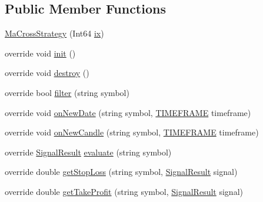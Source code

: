 \subsection*{Public Member Functions}
\begin{DoxyCompactItemize}
\item 
\hyperlink{class_m_q_l4_c_sharp_1_1_user_defined_1_1_strategy_1_1_ma_cross_strategy_ae179f0140b4940b6f551dae60779428c}{Ma\+Cross\+Strategy} (Int64 \hyperlink{class_m_q_l4_c_sharp_1_1_base_1_1_m_q_l_1_1_m_q_l_expert_a98b5a835bb18c023f5160275efa74619}{ix})
\item 
override void \hyperlink{class_m_q_l4_c_sharp_1_1_user_defined_1_1_strategy_1_1_ma_cross_strategy_a76a9c2deb711a2a3a138e7c4018ac866}{init} ()
\item 
override void \hyperlink{class_m_q_l4_c_sharp_1_1_user_defined_1_1_strategy_1_1_ma_cross_strategy_aaffd8074c2a2ac779dba660fa93ac98a}{destroy} ()
\item 
override bool \hyperlink{class_m_q_l4_c_sharp_1_1_user_defined_1_1_strategy_1_1_ma_cross_strategy_a58acaed3f2af61e2e0a44b1000b16dac}{filter} (string symbol)
\item 
override void \hyperlink{class_m_q_l4_c_sharp_1_1_user_defined_1_1_strategy_1_1_ma_cross_strategy_ac368867b2efe1f689dfbd8af2203a203}{on\+New\+Date} (string symbol, \hyperlink{namespace_m_q_l4_c_sharp_1_1_base_1_1_enums_a838810aaa87c63c12737408dba8c0b35}{T\+I\+M\+E\+F\+R\+A\+ME} timeframe)
\item 
override void \hyperlink{class_m_q_l4_c_sharp_1_1_user_defined_1_1_strategy_1_1_ma_cross_strategy_a4bf4c5f90132752210730b75cd911ceb}{on\+New\+Candle} (string symbol, \hyperlink{namespace_m_q_l4_c_sharp_1_1_base_1_1_enums_a838810aaa87c63c12737408dba8c0b35}{T\+I\+M\+E\+F\+R\+A\+ME} timeframe)
\item 
override \hyperlink{class_m_q_l4_c_sharp_1_1_base_1_1_common_1_1_signal_result}{Signal\+Result} \hyperlink{class_m_q_l4_c_sharp_1_1_user_defined_1_1_strategy_1_1_ma_cross_strategy_a70d257bf02bd2ad5ad1fb3d897582b7d}{evaluate} (string symbol)
\item 
override double \hyperlink{class_m_q_l4_c_sharp_1_1_user_defined_1_1_strategy_1_1_ma_cross_strategy_a7225d1e4879db5883b24ffc1dfa3a3ac}{get\+Stop\+Loss} (string symbol, \hyperlink{class_m_q_l4_c_sharp_1_1_base_1_1_common_1_1_signal_result}{Signal\+Result} signal)
\item 
override double \hyperlink{class_m_q_l4_c_sharp_1_1_user_defined_1_1_strategy_1_1_ma_cross_strategy_a8ee72f497d70fb5d75a4a013928d23c9}{get\+Take\+Profit} (string symbol, \hyperlink{class_m_q_l4_c_sharp_1_1_base_1_1_common_1_1_signal_result}{Signal\+Result} signal)

\end{DoxyCompactItemize}
